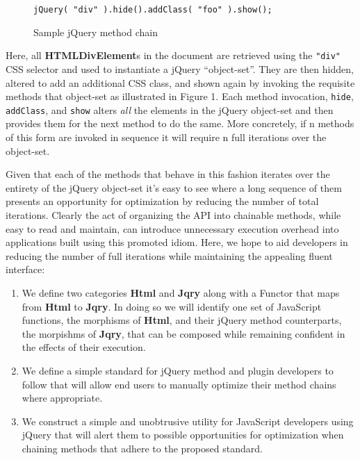 \documentclass[preprint]{sigplanconf}
\begin{document}
\begin{figure}[h!]
\begin{verbatim}
jQuery( "div" ).hide().addClass( "foo" ).show();
\end{verbatim}
\nocaptionrule \caption{Sample jQuery method chain}
\end{figure}

Here, all \textbf{HTMLDivElement}s in the document are retrieved using the \verb|"div"| CSS selector and used to instantiate a jQuery ``object-set''. They are then hidden, altered to add an additional CSS class, and shown again by invoking the requisite methods that object-set as illustrated in Figure 1. Each method invocation, \verb|hide|, \verb|addClass|, and \verb|show| alters \textit{all} the elements in the jQuery object-set and then provides them for the next method to do the same. More concretely, if n methods of this form are invoked in sequence it will require n full iterations over the object-set.

Given that each of the methods that behave in this fashion iterates over the entirety of the jQuery object-set it's easy to see where a long sequence of them presents an opportunity for optimization by reducing the number of total iterations. Clearly the act of organizing the API into chainable methods, while easy to read and maintain, can introduce unnecessary execution overhead into applications built using this promoted idiom. Here, we hope to aid developers in reducing the number of full iterations while maintaining the appealing fluent interface:

\begin{enumerate}
\item We define two categories \textbf{Html} and \textbf{Jqry} along with a Functor that maps from \textbf{Html} to \textbf{Jqry}. In doing so we will identify one set of JavaScript functions, the morphisms of \textbf{Html}, and their jQuery method counterparts, the morpishms of \textbf{Jqry}, that can be composed while remaining confident in the effects of their execution.
\item We define a simple standard for jQuery method and plugin developers to follow that will allow end users to manually optimize their method chains where appropriate.
\item We construct a simple and unobtrusive utility for JavaScript developers using jQuery that will alert them to possible opportunities for optimization when chaining methods that adhere to the proposed standard.
\end{enumerate}
\end{document}
